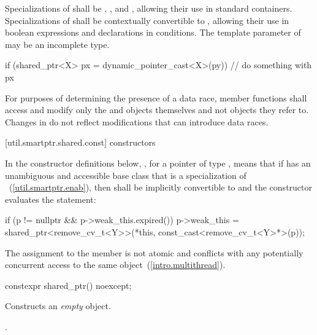 \pnum
Specializations of  shall be ,
, and , allowing their use in standard
containers. Specializations of  shall be
contextually convertible to ,
allowing their use in boolean expressions and declarations in conditions. The template
parameter  of  may be an incomplete type.

\pnum
\enterexample
\begin{codeblock}
if (shared_ptr<X> px = dynamic_pointer_cast<X>(py)) {
  // do something with px
}
\end{codeblock}
\exitexample

\pnum
For purposes of determining the presence of a data race, member functions shall
access and modify only the  and  objects
themselves and not objects they refer to. Changes in  do not
reflect modifications that can introduce data races.

[util.smartptr.shared.const]{ constructors}

\pnum
In the constructor definitions below,
,
for a pointer  of type ,
means that if  has an unambiguous and accessible base class
that is a specialization of ~(\ref{util.smartptr.enab}),
then  shall be implicitly convertible to  and
the constructor evaluates the statement:
\begin{codeblock}
if (p != nullptr && p->weak_this.expired())
  p->weak_this = shared_ptr<remove_cv_t<Y>>(*this, const_cast<remove_cv_t<Y>*>(p));
\end{codeblock}
The assignment to the  member is not atomic and
conflicts with any potentially concurrent access to the same object~(\ref{intro.multithread}).

%
\begin{itemdecl}
constexpr shared_ptr() noexcept;
\end{itemdecl}

\begin{itemdescr}
\pnum\effects  Constructs an \textit{empty}  object.

\pnum\postconditions  {}.
\end{itemdescr}

